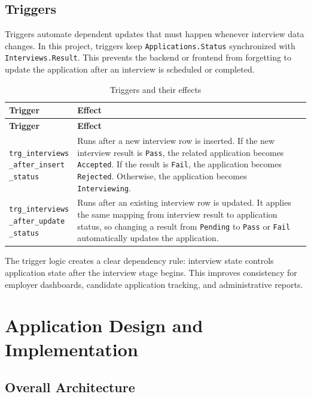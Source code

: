 \documentclass[12pt,a4paper]{report}
\makeatletter
\newcommand{\codebreak}[1]{\begin{tabular}[t]{@{}l@{}}#1\end{tabular}}
\makeatother
\begin{document}
\section{Triggers}

Triggers automate dependent updates that must happen whenever interview data changes. In this project, triggers keep \texttt{Applications.Status} synchronized with \texttt{Interviews.Result}. This prevents the backend or frontend from forgetting to update the application after an interview is scheduled or completed.

\begin{longtable}{L{0.28\textwidth}L{0.62\textwidth}}
\caption{Triggers and their effects}
\label{tab:triggers}\\
\toprule
\textbf{Trigger} & \textbf{Effect} \\
\midrule
\endfirsthead
\toprule
\textbf{Trigger} & \textbf{Effect} \\
\midrule
\endhead
\codebreak{\texttt{trg\_interviews}\\\texttt{\_after\_insert}\\\texttt{\_status}} & Runs after a new interview row is inserted. If the new interview result is \texttt{Pass}, the related application becomes \texttt{Accepted}. If the result is \texttt{Fail}, the application becomes \texttt{Rejected}. Otherwise, the application becomes \texttt{Interviewing}. \\
\codebreak{\texttt{trg\_interviews}\\\texttt{\_after\_update}\\\texttt{\_status}} & Runs after an existing interview row is updated. It applies the same mapping from interview result to application status, so changing a result from \texttt{Pending} to \texttt{Pass} or \texttt{Fail} automatically updates the application. \\
\bottomrule
\end{longtable}

The trigger logic creates a clear dependency rule: interview state controls application state after the interview stage begins. This improves consistency for employer dashboards, candidate application tracking, and administrative reports.

\chapter{Application Design and Implementation}

\section{Overall Architecture}
\end{document}
